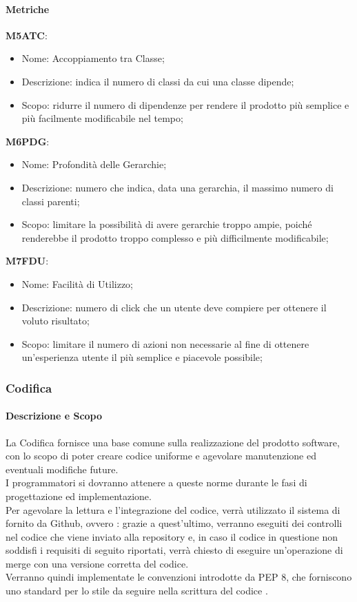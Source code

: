     \paragraph{Metriche} \hfill \break
    \textbf{M5ATC}:
    \begin{itemize}
      \item Nome: Accoppiamento tra Classe;
      \item Descrizione: indica il numero di classi da cui una classe dipende;
      \item Scopo: ridurre il numero di dipendenze per rendere il prodotto più semplice e più facilmente modificabile nel tempo;
    \end{itemize}
    \textbf{M6PDG}:
    \begin{itemize}
      \item Nome: Profondità delle Gerarchie;
      \item Descrizione: numero che indica, data una gerarchia, il massimo numero di classi parenti;
      \item Scopo: limitare la possibilità di avere gerarchie troppo ampie, poiché renderebbe il prodotto troppo complesso e più difficilmente modificabile;
    \end{itemize}
    \textbf{M7FDU}:
    \begin{itemize}
      \item Nome: Facilità di Utilizzo;
      \item Descrizione: numero di click che un utente deve compiere per ottenere il voluto risultato;
      \item Scopo: limitare il numero di azioni non necessarie al fine di ottenere un'esperienza utente il più semplice e piacevole possibile;
    \end{itemize}

	\subsubsection{Codifica} 
		\paragraph{Descrizione e Scopo} \hfill \break
		La Codifica fornisce una base comune sulla realizzazione del prodotto software, con lo scopo di poter creare codice uniforme e agevolare manutenzione ed eventuali modifiche future. \\
		I programmatori si dovranno attenere a queste norme durante le fasi di progettazione ed implementazione. \\
    Per agevolare la lettura e l'integrazione del codice, verrà utilizzato il sistema di  fornito da Github, ovvero : grazie a quest'ultimo, verranno
    eseguiti dei controlli nel codice che viene inviato alla repository e, in caso il codice in questione non soddisfi i requisiti di seguito riportati, verrà chiesto di eseguire un'operazione di merge con una versione corretta del codice. \\
		Verranno quindi implementate le convenzioni introdotte da PEP 8, che forniscono uno standard per lo stile da seguire nella scrittura del codice .

